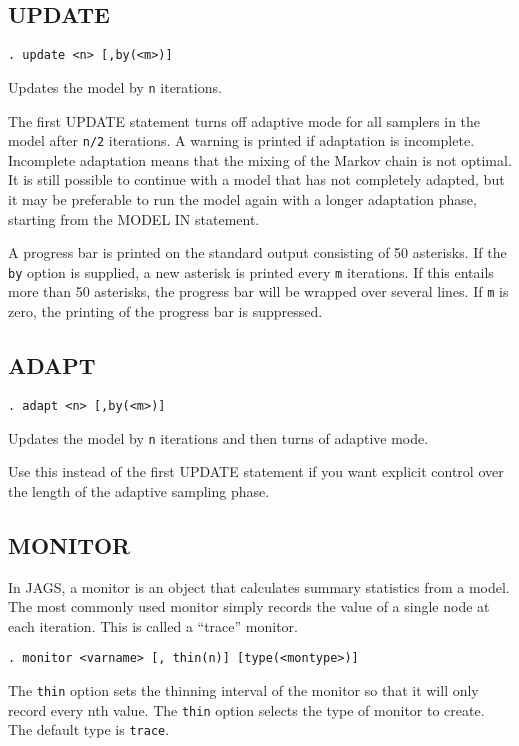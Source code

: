 \documentclass[11pt, a4paper, titlepage]{report}
\newcommand{\JAGS}{\textsf{JAGS}}
\begin{document}
\subsection{UPDATE}

\begin{verbatim}
. update <n> [,by(<m>)]
\end{verbatim}
Updates the model by \texttt{n} iterations. 

The first UPDATE statement turns off adaptive mode for all samplers in
the model after \texttt{n/2} iterations. A warning is printed if
adaptation is incomplete. Incomplete adaptation means that the mixing
of the Markov chain is not optimal. It is still possible to continue
with a model that has not completely adapted, but it may be preferable
to run the model again with a longer adaptation phase, starting from
the MODEL IN statement.

A progress bar is printed on the standard output consisting of 50
asterisks. If the \texttt{by} option is supplied, a new asterisk is
printed every \texttt{m} iterations. If this entails more than 50
asterisks, the progress bar will be wrapped over several lines.  If
\texttt{m} is zero, the printing of the progress bar is suppressed.

\subsection{ADAPT}

\begin{verbatim}
. adapt <n> [,by(<m>)]
\end{verbatim}
Updates the model by \texttt{n} iterations and then turns of
adaptive mode.

Use this instead of the first UPDATE statement if you want explicit
control over the length of the adaptive sampling phase.

\subsection{MONITOR}
\label{section:monitor}

In \JAGS, a monitor is an object that calculates summary statistics
from a model.  The most commonly used monitor simply records the value
of a single node at each iteration.  This is called a ``trace''
monitor. 
\begin{verbatim}
. monitor <varname> [, thin(n)] [type(<montype>)]
\end{verbatim}
The \texttt{thin} option sets the thinning interval of the monitor so
that it will only record every nth value. The \texttt{thin} option 
selects the type of monitor to create. The default type is \texttt{trace}.
\end{document}
